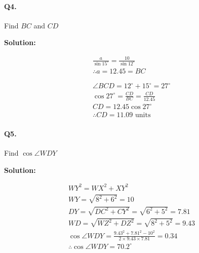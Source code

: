 \documentclass{article}
\begin{document}
\paragraph{Q4.}
Find $BC$ and $CD$


{\scriptsize \textbf{Solution:}}

\[
  \begin{aligned}
    \frac{a}{\sin 15^{\circ}} = \frac{10}{\sin 12^{\circ}} \\
    \therefore a = 12.45 = BC \\
    \\
    \\
    \angle BCD = 12^{\circ}+15^{\circ}=27^{\circ} \\
    \cos 27^{\circ} = \frac{CD}{BC} = \frac{CD}{12.45} \\
    CD = 12.45 \cos 27^{\circ} \\
    \therefore CD = 11.09 \text{ units}
  \end{aligned}
\]

\paragraph{Q5.}
Find $\cos \angle WDY$

{\scriptsize \textbf{Solution:}}

\[
  \begin{aligned}
    WY^{2} = WX^{2} + XY^{2} \\
    WY = \sqrt{8^{2}+6^{2}} = 10 \\
    DY = \sqrt{DC^{2}+CY^{2}} = \sqrt{6^{2}+5^{2}} = 7.81 \\
    WD = \sqrt{WZ^{2}+DZ^{2}} = \sqrt{8^{2}+5^{2}} = 9.43 \\
    \cos \angle WDY = \frac{9.43^{2}+7.81^{2}-10^{2}}{2\times9.43\times7.81} = 0.34 \\
    \therefore \cos \angle WDY = 70.2^{\circ}
  \end{aligned}
\]
\end{document}
